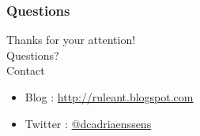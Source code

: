 \documentclass[14pt]{beamer}
\begin{document}
  \begin{frame}
   \frametitle{Questions}
    Thanks for your attention!\\
    Questions?\\
    Contact
    \begin{itemize}
      \item Blog : \href{http://ruleant.blogspot.com/}{http://ruleant.blogspot.com}
      \item Twitter : \href{https://twitter.com/dcadriaenssens}{@dcadriaenssens}
    \end{itemize}
  \end{frame}
\end{document}
